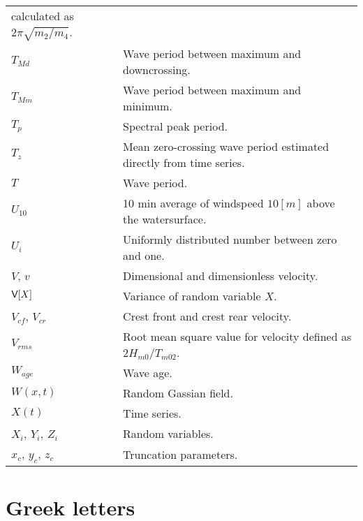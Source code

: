 \begin{tabular}{p{23mm}p{125mm}}
                calculated as $2\pi\sqrt{m_{2}/m_{4}}$. \\
  $T_{Md}$ & Wave period between maximum and downcrossing.\\
  $T_{Mm}$ & Wave period between maximum and minimum.\\
  $T_{p}$                     & Spectral peak period. \\
  $T_{z}$                     & Mean zero-crossing wave period
  estimated directly from time series. \\
  $T$ & Wave period. \\
  $U_{10}$ & 10 min average of windspeed $10 [m]$ above the
  watersurface.\\
  $U_{i}$ & Uniformly distributed number between zero and one.\\
  $V$, $v$                    & Dimensional and dimensionless velocity. \\
  $\mbox{\sf V} [X]$                    & Variance of random variable $X$.\\
  $V_{cf}$,  $V_{cr}$         & Crest front and crest rear velocity. \\
  $V_{rms}$                   & Root mean square value for velocity
                               defined as $2 H_{m0}/T_{m02}$.\\
  $W_{age}$ & Wave age.\\
 $W(x,t)$ & Random Gassian field.\\
 $X(t)$   & Time series.\\
 $X_{i}$, $Y_i$,  $Z_{i}$ & Random variables.\\
 $x_{c}$, $y_c$, $z_{c}$ & Truncation parameters.\\
\end{tabular}

\section*{Greek letters}


